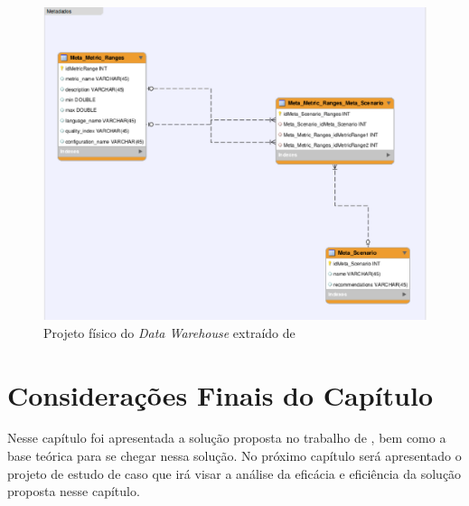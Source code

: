 \begin{figure}[h!]
\centering
\includegraphics[keepaspectratio=false,scale=0.6]{figuras/figuras_matheus/metadados-baufaker.eps}
\caption{Projeto físico do \textit{Data Warehouse} extraído de }
\label{fig:metadados}
\end{figure}
\FloatBarrier



\section{Considerações Finais do Capítulo}

Nesse capítulo foi apresentada a solução proposta no trabalho de , bem como a base teórica para se chegar nessa solução. No próximo capítulo será apresentado o projeto de estudo de caso que irá visar a análise da eficácia e eficiência da solução proposta nesse capítulo.
